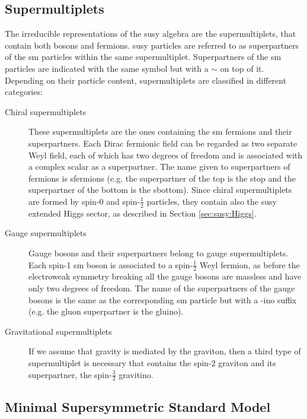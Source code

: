 \subsection{Supermultiplets}

The irreducible representations of the \gls{susy} algebra are the supermultiplets, that contain both bosons and fermions. 
\gls{susy} particles are referred to as superpartners of the \gls{sm} particles within the same supermultiplet.
Superpartners of the \gls{sm} particles are indicated with the same symbol but with a $\sim$ on top of it. Depending on their particle content, supermultiplets are classified in different categories:

\begin{description}
\item[Chiral supermultiplets] These supermultiplets are the ones containing the \gls{sm} fermions and their superpartners. Each Dirac fermionic field can be regarded as two separate Weyl field, each of which has two degrees of freedom and is associated with a complex scalar as a superpartner. The name given to superpartners of fermions is sfermions (e.g. the superpartner of the top is the stop and the superpartner of the bottom is the sbottom). Since chiral supermultiplets are formed by spin-0 and spin-$\frac{1}{2}$ particles, they contain also the \gls{susy} extended Higgs sector, as described in Section \ref{sec:susy:Higgs}.

\item[Gauge supermultiplets] Gauge bosons and their superpartners belong to gauge supermultiplets. Each spin-1 \gls{sm} boson is associated to a spin-$\frac{1}{2}$ Weyl fermion, as before the electroweak symmetry breaking all the gauge bosons are massless and have only two degrees of freedom. The name of the superpartners of the gauge bosons is the same as the corresponding \gls{sm} particle but with a -ino suffix (e.g. the gluon superpartner is the gluino). 

\item[Gravitational supermultiplets] If we assume that gravity is mediated by the graviton, then a third type of supermultiplet is necessary that contains the spin-2 graviton and its superpartner, the spin-$\frac{3}{2}$ gravitino.

\end{description}




\subsection{Minimal Supersymmetric Standard Model}

